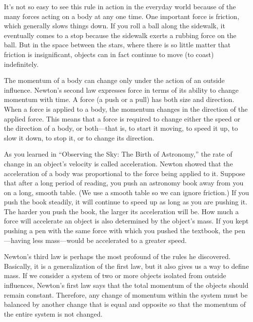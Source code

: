 \documentclass[../../main-astronomy.tex]{subfiles}
\begin{document}
\vspace{1em}

It’s not so easy to see this rule in action in the everyday world because of the many forces acting on a body at any one time. One important force is friction, which generally slows things down. If you roll a ball along the sidewalk, it eventually comes to a stop because the sidewalk exerts a rubbing force on the ball. But in the space between the stars, where there is so little matter that friction is insignificant, objects can in fact continue to move (to coast) indefinitely.

\vspace{1em}

The momentum of a body can change only under the action of an outside influence. Newton’s second law expresses force in terms of its ability to change momentum with time. A force (a push or a pull) has both size and direction. When a force is applied to a body, the momentum changes in the direction of the applied force. This means that a force is required to change either the speed or the direction of a body, or both---that is, to start it moving, to speed it up, to slow it down, to stop it, or to change its direction.

\vspace{1em}

As you learned in ``Observing the Sky: The Birth of Astronomy,'' the rate of change in an object’s velocity is called acceleration. Newton showed that the acceleration of a body was proportional to the force being applied to it. Suppose that after a long period of reading, you push an astronomy book away from you on a long, smooth table. (We use a smooth table so we can ignore friction.) If you push the book steadily, it will continue to speed up as long as you are pushing it. The harder you push the book, the larger its acceleration will be. How much a force will accelerate an object is also determined by the object’s mass. If you kept pushing a pen with the same force with which you pushed the textbook, the pen---having less mass---would be accelerated to a greater speed.

\vspace{1em}

Newton’s third law is perhaps the most profound of the rules he discovered. Basically, it is a generalization of the first law, but it also gives us a way to define mass. If we consider a system of two or more objects isolated from outside influences, Newton’s first law says that the total momentum of the objects should remain constant. Therefore, any change of momentum within the system must be balanced by another change that is equal and opposite so that the momentum of the entire system is not changed.
\end{document}
